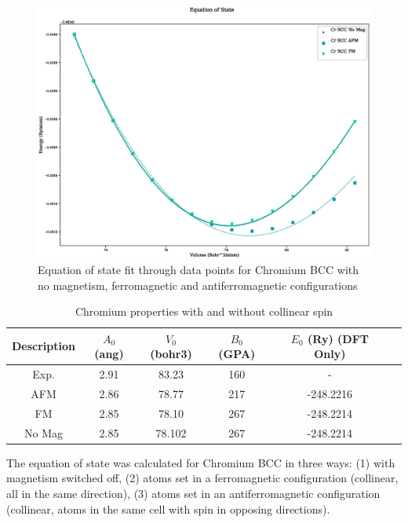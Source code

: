 \FloatBarrier
\begin{figure}[h]
\begin{center}
\includegraphics[scale=0.45]{chapters/potentials_fe_pd_ru/qeeos_plots/cr-mag/eos.eps}
\caption{Equation of state fit through data points for Chromium BCC with no magnetism, ferromagnetic and antiferromagnetic configurations}
\label{fig:chromiumeos}
\end{center}
\end{figure}


\FloatBarrier
\begin{table}[h]
\begin{center}
\renewcommand{\arraystretch}{1.2}
\begin{tabular}{c c c c c c}
\hline\hline
Description & $A_0$ (ang) & $V_0$ (bohr3) & $B_0$ (GPA) & $E_0$ (Ry) (DFT Only) \\
\hline\hline
Exp. & 2.91 & 83.23 & 160 & - \\
AFM & 2.86 & 78.77 & 217 & -248.2216 \\
FM & 2.85 & 78.10 & 267 & -248.2214 \\
No Mag & 2.85 & 78.102 & 267 & -248.2214 \\
\hline\hline
\end{tabular}
\end{center}
\caption{Chromium properties with and without collinear spin}
\label{table:crproperties}
\end{table}
\FloatBarrier

The equation of state was calculated for Chromium BCC in three ways: (1) with magnetism switched off, (2) atoms set in a ferromagnetic configuration (collinear, all in the same direction), (3) atoms set in an antiferromagnetic configuration (collinear, atoms in the same cell with spin in opposing directions).  

